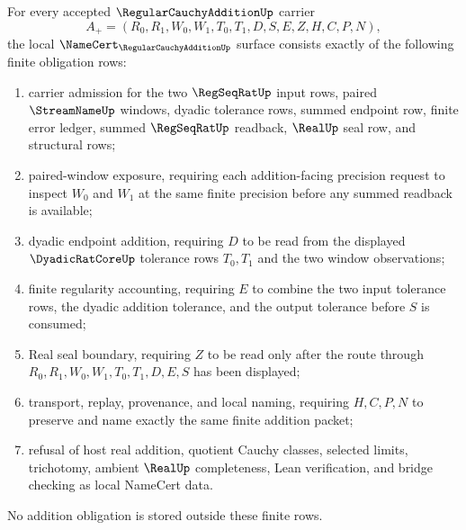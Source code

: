 \begin{theorem}
\label{thm:regular-cauchy-addition-namecert-obligations}
For every accepted $\RegularCauchyAdditionUp$ carrier
$$
A_+=(R_0,R_1,W_0,W_1,T_0,T_1,D,S,E,Z,H,C,P,N),
$$
the local $\NameCert_{\RegularCauchyAdditionUp}$ surface consists exactly of the following finite obligation rows:
\begin{enumerate}
\item carrier admission for the two $\RegSeqRatUp$ input rows, paired $\StreamNameUp$ windows, dyadic tolerance rows, summed endpoint row, finite error ledger, summed $\RegSeqRatUp$ readback, $\RealUp$ seal row, and structural rows;
\item paired-window exposure, requiring each addition-facing precision request to inspect $W_0$ and $W_1$ at the same finite precision before any summed readback is available;
\item dyadic endpoint addition, requiring $D$ to be read from the displayed $\DyadicRatCoreUp$ tolerance rows $T_0,T_1$ and the two window observations;
\item finite regularity accounting, requiring $E$ to combine the two input tolerance rows, the dyadic addition tolerance, and the output tolerance before $S$ is consumed;
\item Real seal boundary, requiring $Z$ to be read only after the route through $R_0,R_1,W_0,W_1,T_0,T_1,D,E,S$ has been displayed;
\item transport, replay, provenance, and local naming, requiring $H,C,P,N$ to preserve and name exactly the same finite addition packet;
\item refusal of host real addition, quotient Cauchy classes, selected limits, trichotomy, ambient $\RealUp$ completeness, Lean verification, and bridge checking as local NameCert data.
\end{enumerate}
No addition obligation is stored outside these finite rows.
\end{theorem}
